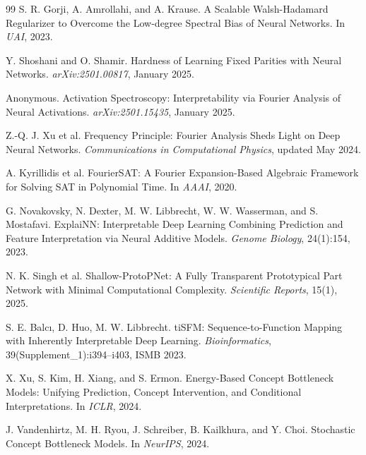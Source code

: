 \documentclass[Royal,times,sageh]{sagej}
\begin{document}
\begin{thebibliography}{99}
S. R. Gorji, A. Amrollahi, and A. Krause.
\newblock A Scalable Walsh-Hadamard Regularizer to Overcome the Low-degree Spectral Bias of Neural Networks.
\newblock In \textit{UAI}, 2023.

Y. Shoshani and O. Shamir.
\newblock Hardness of Learning Fixed Parities with Neural Networks.
\newblock \textit{arXiv:2501.00817}, January 2025.

Anonymous.
\newblock Activation Spectroscopy: Interpretability via Fourier Analysis of Neural Activations.
\newblock \textit{arXiv:2501.15435}, January 2025.

Z.-Q. J. Xu et al.
\newblock Frequency Principle: Fourier Analysis Sheds Light on Deep Neural Networks.
\newblock \textit{Communications in Computational Physics}, updated May 2024.

A. Kyrillidis et al.
\newblock FourierSAT: A Fourier Expansion-Based Algebraic Framework for Solving SAT in Polynomial Time.
\newblock In \textit{AAAI}, 2020.

G. Novakovsky, N. Dexter, M. W. Libbrecht, W. W. Wasserman, and S. Mostafavi.
\newblock ExplaiNN: Interpretable Deep Learning Combining Prediction and Feature Interpretation via Neural Additive Models.
\newblock \textit{Genome Biology}, 24(1):154, 2023.

N. K. Singh et al.
\newblock Shallow-ProtoPNet: A Fully Transparent Prototypical Part Network with Minimal Computational Complexity.
\newblock \textit{Scientific Reports}, 15(1), 2025.

S. E. Balc\i, D. Huo, M. W. Libbrecht.
\newblock tiSFM: Sequence-to-Function Mapping with Inherently Interpretable Deep Learning.
\newblock \textit{Bioinformatics}, 39(Supplement\_1):i394--i403, ISMB 2023.

X. Xu, S. Kim, H. Xiang, and S. Ermon.
\newblock Energy-Based Concept Bottleneck Models: Unifying Prediction, Concept Intervention, and Conditional Interpretations.
\newblock In \textit{ICLR}, 2024.

J. Vandenhirtz, M. H. Ryou, J. Schreiber, B. Kailkhura, and Y. Choi.
\newblock Stochastic Concept Bottleneck Models.
\newblock In \textit{NeurIPS}, 2024.


\end{thebibliography}
\end{document}
